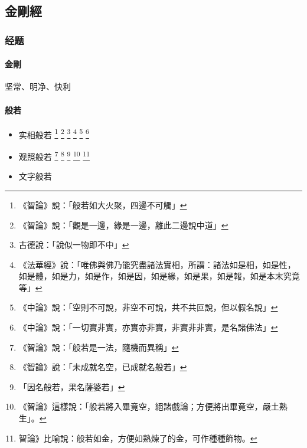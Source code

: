 \subsection{金剛經}

\subsubsection{经题}
\paragraph{金剛} 坚常、明净、快利
\paragraph{般若}
\begin{itemize}
  \item 实相般若
    \footnote{《智論》說：「般若如大火聚，四邊不可觸」}
    \footnote{《智論》說：「觀是一邊，緣是一邊，離此二邊說中道」}
    \footnote{古德說：「說似一物即不中」}
    \footnote{《法華經》說：「唯佛與佛乃能究盡諸法實相，所謂：諸法如是相，如是性，如是體，如是力，如是作，如是因，如是緣，如是果，如是報，如是本末究竟等」}
    \footnote{《中論》說：「空則不可說，非空不可說，共不共叵說，但以假名說」}
    \footnote{《中論》說：「一切實非實，亦實亦非實，非實非非實，是名諸佛法」}
  \item 观照般若
    \footnote{《智論》說：「般若是一法，隨機而異稱」}
    \footnote{《智論》說：「未成就名空，已成就名般若」}
    \footnote{「因名般若，果名薩婆若」}
    \footnote{《智論》這樣說：「般若將入畢竟空，絕諸戲論；方便將出畢竟空，嚴土熟生」。}
    \footnote{智論》比喻說：般若如金，方便如熟煉了的金，可作種種飾物。}
  \item 文字般若
\end{itemize}
